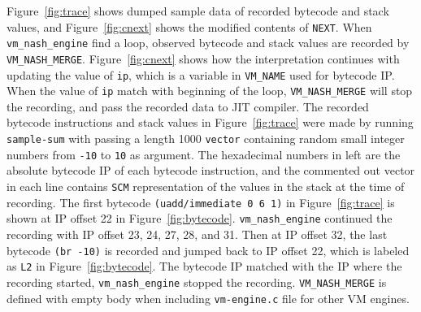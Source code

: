 \documentclass[preprint, 10pt]{sigplanconf}
\begin{document}
Figure~\hyperref[fig:trace]{\ref{fig:trace}} shows dumped sample data of
recorded bytecode and stack values, and
Figure~\hyperref[fig:cnext]{\ref{fig:cnext}} shows the modified contents of
\texttt{NEXT}. When \texttt{vm\_nash\_engine} find a loop, observed bytecode and
stack values are recorded by
\texttt{VM\_NASH\_MERGE}. Figure~\hyperref[fig:cnext]{\ref{fig:cnext}} shows how
the interpretation continues with updating the value of \texttt{ip}, which is a
variable in \texttt{VM\_NAME} used for bytecode IP. When the value of
\texttt{ip} match with beginning of the loop, \texttt{VM\_NASH\_MERGE} will stop
the recording, and pass the recorded data to JIT compiler. The recorded bytecode
instructions and stack values in Figure~\hyperref[fig:trace]{\ref{fig:trace}}
were made by running \texttt{sample-sum} with passing a length 1000
\texttt{vector} containing random small integer numbers from \texttt{-10} to
\texttt{10} as argument. The hexadecimal numbers in left are the absolute
bytecode IP of each bytecode instruction, and the commented out vector in each
line contains \texttt{SCM} representation of the values in the stack at the time
of recording.  The first bytecode \texttt{(uadd/immediate 0 6 1)} in
Figure~\hyperref[fig:trace]{\ref{fig:trace}} is shown at IP offset 22 in
Figure~\hyperref[fig:bytecode]{\ref{fig:bytecode}}. \texttt{vm\_nash\_engine}
continued the recording with IP offset 23, 24, 27, 28, and 31. Then at IP offset
32, the last bytecode \texttt{(br -10)} is recorded and jumped back to IP offset
22, which is labeled as \texttt{L2} in
Figure~\hyperref[fig:bytecode]{\ref{fig:bytecode}}. The bytecode IP matched with
the IP where the recording started, \texttt{vm\_nash\_engine} stopped the
recording. \texttt{VM\_NASH\_MERGE} is defined with empty body when including
\texttt{vm-engine.c} file for other VM engines.

\end{document}
